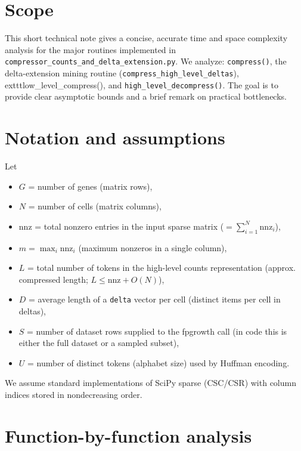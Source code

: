 \documentclass[11pt]{article}
\author{scRNA\_Compression (Neko-23)}
\date{\today}
\begin{document}
\maketitle

\section*{Scope}
This short technical note gives a concise, accurate time and space complexity analysis
for the major routines implemented in \texttt{compressor\_counts\_and\_delta\_extension.py}.
We analyze: \texttt{compress()}, the delta-extension mining routine (\texttt{compress\_high\_level\_deltas}),
	exttt{low\_level\_compress()}, and \texttt{high\_level\_decompress()}. The goal is to provide clear
asymptotic bounds and a brief remark on practical bottlenecks.

\section*{Notation and assumptions}
Let
\begin{itemize}
	\item $G$ = number of genes (matrix rows),
	\item $N$ = number of cells (matrix columns),
	\item $\mathrm{nnz}$ = total nonzero entries in the input sparse matrix ($=\sum_{i=1}^N \mathrm{nnz}_i$),
	\item $m = \max_i \mathrm{nnz}_i$ (maximum nonzeros in a single column),
	\item $L$ = total number of tokens in the high-level counts representation (approx. compressed length; $L\le \mathrm{nnz}+O(N)$),
	\item $D$ = average length of a \texttt{delta} vector per cell (distinct items per cell in deltas),
	\item $S$ = number of dataset rows supplied to the fpgrowth call (in code this is either the full dataset or a sampled subset),
	\item $U$ = number of distinct tokens (alphabet size) used by Huffman encoding.
\end{itemize}

We assume standard implementations of SciPy sparse (CSC/CSR) with column indices stored in nondecreasing order.

\section*{Function-by-function analysis}
\end{document}
